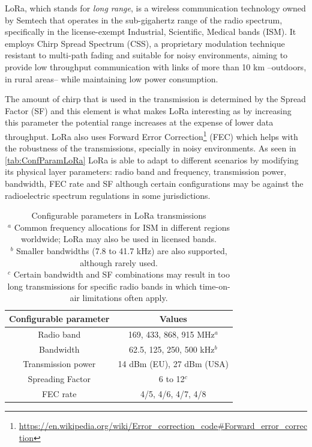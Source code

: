 LoRa, which stands for \textit{long range}, is a wireless communication technology owned by Semtech that operates in the sub-gigahertz range of the radio spectrum, specifically in the license-exempt Industrial, Scientific, Medical bands (ISM). It employs Chirp Spread Spectrum (CSS), a proprietary modulation technique resistant to multi-path fading and suitable for noisy environments, aiming to provide low throughput communication with links of more than 10 km –outdoors, in rural areas– while maintaining low power consumption.\cite{Augustin2016}

The amount of chirp that is used in the transmission is determined by the Spread Factor (SF) and this element is what makes LoRa interesting as by increasing this parameter the potential range increases at the expense of lower data throughput. 
LoRa also uses Forward Error Correction\footnote{\url{https://en.wikipedia.org/wiki/Error\_correction\_code\#Forward\_error\_correction}} (FEC) which helps with the robustness of the transmissions, specially in noisy environments.
As seen in \autoref{tab:ConfParamLoRa} LoRa is able to adapt to different scenarios by modifying its physical layer parameters: radio band and frequency, transmission power, bandwidth, FEC rate and SF although certain configurations may be against the radioelectric spectrum regulations in some jurisdictions.

\begin{table}[]
\centering
\begin{tabular}{|c|c|}
\hline
Configurable parameter & Values                    \\ \hline
Radio band             & 169, 433, 868, 915 MHz$^{a}$  \\ \hline
Bandwidth              & 62.5, 125, 250, 500 kHz$^{b}$ \\ \hline
Transmission power     & 14 dBm (EU), 27 dBm (USA) \\ \hline
Spreading Factor       & 6 to 12$^{c}$                 \\ \hline
FEC rate               & 4/5, 4/6, 4/7, 4/8        \\ \hline
\end{tabular}
\caption{Configurable parameters in LoRa transmissions \\
$^{a}$  Common frequency allocations for ISM in different regions worldwide; LoRa may also be used in licensed bands. \\
$^{b}$  Smaller bandwidths (7.8 to 41.7 kHz) are also supported, although rarely used. \\
$^{c}$  Certain bandwidth and SF combinations may result in too long transmissions for specific radio bands in which time-on-air limitations often apply.}
\label{tab:ConfParamLoRa}
\cite{StarOfStars}
\end{table}

